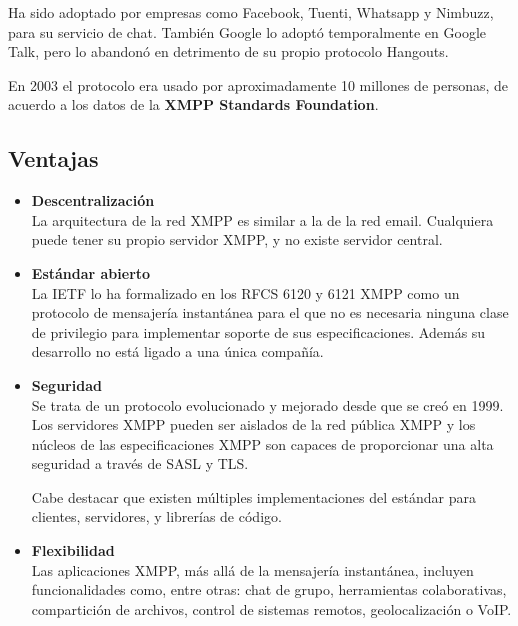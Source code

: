 \documentclass[a4paper, 11pt]{article} %
\begin{document}
  Ha sido adoptado por empresas como Facebook, Tuenti, Whatsapp y Nimbuzz, para
  su servicio de chat. También Google lo adoptó temporalmente en Google 
  Talk, pero lo abandonó en detrimento de su propio protocolo Hangouts.

  En 2003 el protocolo era usado por aproximadamente 10 millones de personas,
  de acuerdo a los datos de la \textbf{XMPP Standards Foundation}.
   
   \subsection{Ventajas}
   \begin{itemize}
     \item \textbf{Descentralización}\\
     La arquitectura de la red XMPP es similar a la de la red email. Cualquiera
     puede tener su propio servidor XMPP, y no existe servidor central.
     
     \item \textbf{Estándar abierto}\\
     La IETF lo ha formalizado en los RFCS 6120 y 6121 XMPP como un protocolo de 
     mensajería instantánea para el que no es necesaria ninguna clase de privilegio
     para implementar soporte de sus especificaciones. Además su desarrollo no 
     está ligado a una única compañía.
     
     \item \textbf{Seguridad}\\
     Se trata de un protocolo evolucionado y mejorado desde que se creó en 1999. 
     Los servidores XMPP pueden ser aislados de la red pública XMPP y los núcleos
     de las especificaciones XMPP son capaces de proporcionar una alta seguridad
     a través de SASL y TLS.
     
     Cabe destacar que existen múltiples implementaciones del estándar para clientes,
     servidores, y librerías de código.
     
     \item \textbf{Flexibilidad}\\
     Las aplicaciones XMPP, más allá de la mensajería instantánea, incluyen funcionalidades
     como, entre otras: chat de grupo, herramientas colaborativas, compartición de archivos, 
     control de sistemas remotos, geolocalización o VoIP.
   \end{itemize}
 
\end{document}
